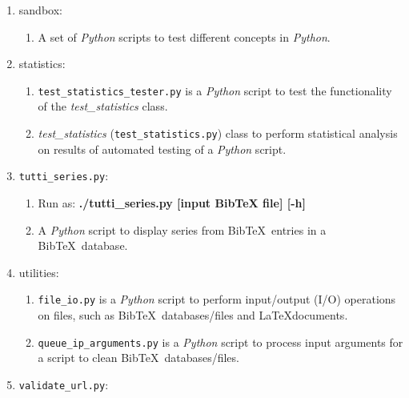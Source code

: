 \begin{enumerate}
\begin{enumerate}
	\item {\it [output BibTeX file]} is an optional parameter.
	\item A {\it Python} script to delint/remove {\sc Bib}\TeX\ metadata from a {\sc Bib}\TeX\ database/file.
	\end{enumerate}
\item sandbox: \vspace{-0.3cm}
	\begin{enumerate} \itemsep -2pt
	\item A set of {\it Python} scripts to test different concepts in {\it Python}.
	\end{enumerate}
\item statistics: \vspace{-0.3cm}
	\begin{enumerate} \itemsep -2pt
	\item {\tt test\_statistics\_tester.py} is a {\it Python} script to test the functionality of the {\it test\_statistics} class.
	\item {\it test\_statistics} ({\tt test\_statistics.py}) class to perform statistical analysis on results of automated testing of a {\it Python} script.
	\end{enumerate}
\item {\tt tutti\_series.py}: \vspace{-0.3cm}
	\begin{enumerate} \itemsep -2pt
	\item Run as: {\bf ./tutti\_series.py [input BibTeX file] [-h]}
	\item A {\it Python} script to display series from {\sc Bib}\TeX\ entries in a {\sc Bib}\TeX\ database.
	\end{enumerate}
\item utilities: \vspace{-0.3cm}
	\begin{enumerate} \itemsep -2pt
	\item {\tt file\_io.py} is a {\it Python} script to perform input/output (I/O) operations on files, such as {\sc Bib}\TeX\ databases/files and \LaTeX documents.
	\item {\tt queue\_ip\_arguments.py} is a {\it Python} script to process input arguments for a script to clean {\sc Bib}\TeX\ databases/files.
	\end{enumerate}
\item {\tt validate\_url.py}: \vspace{-0.3cm}
	\begin{enumerate} \itemsep -2pt

\end{enumerate}
\end{enumerate}
